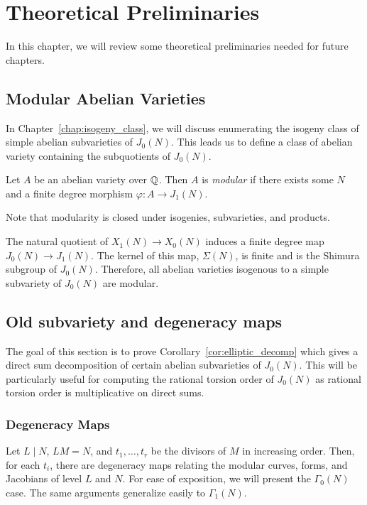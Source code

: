 \chapter{Theoretical Preliminaries}%
\label{chap:prelim}

In this chapter, we will review some theoretical preliminaries needed for
future chapters. 

\section{Modular Abelian Varieties}

In Chapter~\ref{chap:isogeny_class}, we will discuss enumerating the isogeny
class of simple abelian subvarieties of $J_0(N)$. This leads us to define a
class of abelian variety containing the subquotients of $J_0(N)$.

\begin{definition}
    \label{defn:modabvar}
    Let $A$ be an abelian variety over $\mathbb{Q}$. Then $A$ is \emph{modular} if
    there exists some $N$ and a finite degree morphism $\varphi:A\to J_1(N)$.

    Note that modularity is closed under isogenies, subvarieties, and products.
\end{definition}

The natural quotient of $X_1(N)\to X_0(N)$ induces a finite degree map
$J_0(N)\to J_1(N)$. The kernel of this map, $\Sigma(N)$, is finite and is the
Shimura subgroup of $J_0(N)$. Therefore, all abelian varieties isogenous to a
simple subvariety of $J_0(N)$ are modular.

\section{Old subvariety and degeneracy maps}

The goal of this section is to prove Corollary~\ref{cor:elliptic_decomp} which
gives a direct sum decomposition of certain abelian subvarieties of $J_0(N)$.
This will be particularly useful for computing the rational torsion order of
$J_0(N)$ as rational torsion order is multiplicative on direct sums.

\subsection{Degeneracy Maps}%
\label{sub:degeneracy_maps}

Let $L\mid N$, $LM=N$, and $t_1,\ldots,t_r$ be the divisors of $M$ in
increasing order. Then, for each $t_i$, there are degeneracy maps relating the
modular curves, forms, and Jacobians of level $L$ and $N$. For ease of
exposition, we will present the $\Gamma_0(N)$ case. The same arguments
generalize easily to $\Gamma_1(N)$.

